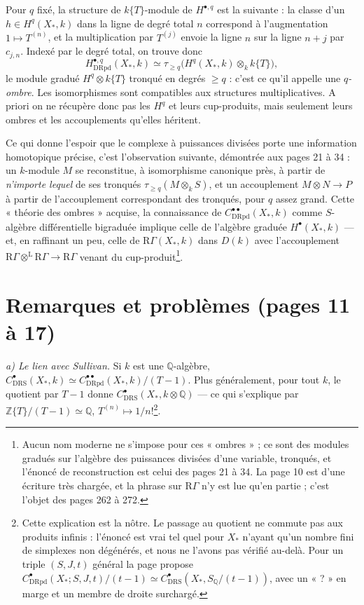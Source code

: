 \documentclass[11pt,a4paper]{article}
\begin{document}
Pour $q$ fixé, la structure de $k\{T\}$-module de $H^{\bullet, q}$ est la
suivante : la classe d'un $h \in H^q(X_*, k)$ dans la ligne de degré total $n$
correspond à l'augmentation $1 \mapsto T^{(n)}$, et la multiplication par
$T^{(j)}$ envoie la ligne $n$ sur la ligne $n+j$ par $c_{j,n}$. Indexé par le
degré total, on trouve donc
\[
H^{\bullet, q}_{\mathrm{DRpd}}(X_*, k) \simeq \tau_{\geq q}\bigl(H^q(X_*, k) \otimes_k k\{T\}\bigr) ,
\]
le module gradué $H^q \otimes k\{T\}$ tronqué en degrés $\geq q$ : c'est ce
qu'il appelle une \emph{$q$-ombre}. Les isomorphismes sont compatibles aux
structures multiplicatives. A priori on ne récupère donc pas les $H^q$ et leurs
cup-produits, mais seulement leurs ombres et les accouplements qu'elles
héritent.

Ce qui donne l'espoir que le complexe à puissances divisées porte une
information homotopique précise, c'est l'observation suivante, démontrée aux
pages 21 à 34 : un $k$-module $M$ se reconstitue, à isomorphisme canonique près,
à partir de \emph{n'importe lequel} de ses tronqués $\tau_{\geq q}(M \otimes_k
S)$, et un accouplement $M \otimes N \to P$ à partir de l'accouplement
correspondant des tronqués, pour $q$ assez grand. Cette « théorie des ombres »
acquise, la connaissance de $C^{\bullet\bullet}_{\mathrm{DRpd}}(X_*, k)$
comme $S$-algèbre différentielle bigraduée implique celle de l'algèbre graduée
$H^\bullet(X_*, k)$ — et, en raffinant un peu, celle de
$\mathrm{R}\Gamma(X_*, k)$ dans $D(k)$ avec l'accouplement
$\mathrm{R}\Gamma \otimes^{\mathrm{L}} \mathrm{R}\Gamma \to \mathrm{R}\Gamma$
venant du cup-produit\footnote{Aucun nom moderne ne s'impose pour ces
« ombres » ; ce sont des modules gradués sur l'algèbre des puissances divisées
d'une variable, tronqués, et l'énoncé de reconstruction est celui des pages 21
à 34. La page 10 est d'une écriture très chargée, et la phrase sur
$\mathrm{R}\Gamma$ n'y est lue qu'en partie ; c'est l'objet des pages 262 à
272.}.

\section*{Remarques et problèmes (pages 11 à 17)}

\emph{a) Le lien avec Sullivan.} Si $k$ est une $\mathbb{Q}$-algèbre,
$C^\bullet_{\mathrm{DRS}}(X_*, k) \simeq C^{\bullet\bullet}_{\mathrm{DRpd}}(X_*,
k)/(T-1)$. Plus généralement, pour tout $k$, le quotient par $T - 1$ donne
$C^\bullet_{\mathrm{DRS}}(X_*, k \otimes \mathbb{Q})$ — ce qui s'explique par
$\mathbb{Z}\{T\}/(T-1) \simeq \mathbb{Q}$, $T^{(n)} \mapsto 1/n!$\footnote{Cette
explication est la nôtre. Le passage au quotient ne commute pas aux produits
infinis : l'énoncé est vrai tel quel pour $X_*$ n'ayant qu'un nombre fini de
simplexes non dégénérés, et nous ne l'avons pas vérifié au-delà. Pour un triple
$(S,J,t)$ général la page propose
$C^\bullet_{\mathrm{DRpd}}(X_*; S,J,t)/(t-1) \simeq C^\bullet_{\mathrm{DRS}}(X_*,
S_{\mathbb{Q}}/(t-1))$, avec un « ? » en marge et un membre de droite
surchargé.}.
\end{document}
